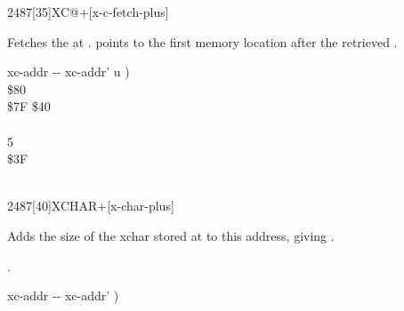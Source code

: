 \vspace*{-2ex}
\begin{worddef}{2487}[35]{XC@+}[x-c-fetch-plus]%
\item {}

	Fetches the  at .  
	points to the first memory location after the retrieved .
	
	\begin{implement} %
	\word{:}   xc-addr -{}- xc-addr' u ) \\
	\tab {}  \$80        \\
   \tab \$7F  \$40  \\
	\tab {}       \\
	   5     \\
	\tab[2] \$3F    \\
	\tab {}   \\
	\word{;}
	\end{implement}

%
\end{worddef}

\vspace*{-2ex}
\begin{worddef}{2487}[40]{XCHAR+}[x-char-plus]%
\item {}

	Adds the size of the xchar stored at  to this address,
	giving .

	\see {}.

	\begin{implement} %
	\word{:}   xc-addr -{}- xc-addr' )    \word{;}
	\end{implement}
\end{worddef}

